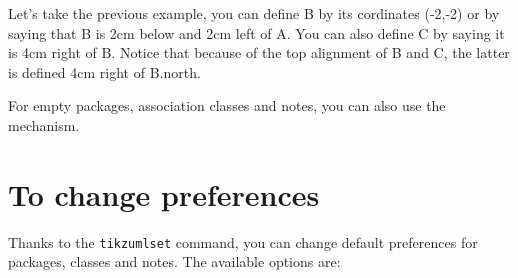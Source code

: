 \documentclass[a4paper,11pt]{report}
\begin{document}
\medskip

Let's take the previous example, you can define B by its cordinates (-2,-2) or by saying that B is 2cm below and 2cm left of A. You can also define C by saying it is 4cm right of B. Notice that because of the top alignment of B and C, the latter is defined 4cm right of B.north.

\medskip

\begin{minipage}{0.5\textwidth}

\end{minipage}
\begin{minipage}{0.5\textwidth}
\begin{center}
\end{center}
\end{minipage}

\medskip

For empty packages, association classes and notes, you can also use the mechanism.

\section{To change preferences}\label{s.classset}

Thanks to the {\tt tikzumlset} command, you can change default preferences for packages, classes and notes. The available options are:
\end{document}
